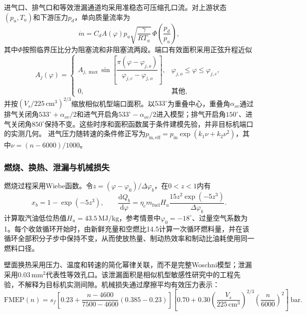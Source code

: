 \documentclass[withoutpreface,bwprint]{cumcmthesis}
\begin{document}
进气口、排气口和等效泄漏通道均采用准稳态可压缩孔口流\cite{blair1999engine}。对上游状态$(p_u,T_u)$和下游压力$p_d$，单向质量流率为
\begin{equation}
 \dot m=C_dA(\varphi)p_u\sqrt{\frac{\gamma}{RT_u}}\,
 \Phi\!\left(\frac{p_d}{p_u}\right),
 \label{eq:q2-orifice}
\end{equation}
其中$\Phi$按照临界压比分为阻塞流和非阻塞流两段。端口有效面积采用正弦升程近似
\begin{equation}
 A_j(\varphi)=
 \begin{cases}
 A_{j,\max}\sin\!\left[\dfrac{\pi(\varphi-\varphi_{j,o})}
 {\varphi_{j,c}-\varphi_{j,o}}\right],
 &\varphi_{j,o}\leq\varphi\leq\varphi_{j,c},\\
 0,&\text{其他},
 \end{cases}
 \label{eq:q2-port-area}
\end{equation}
并按$(V_s/225\,\mathrm{cm^3})^{2/3}$缩放相似机型端口面积。以$533^\circ$为重叠中心，重叠角$\alpha_{ov}$通过排气关闭角$533^\circ+\alpha_{ov}/2$和进气开启角$533^\circ-\alpha_{ov}/2$进入模型；排气开启角$150^\circ$、进气关闭角$850^\circ$保持不变。这些时序和面积函数属于条件建模先验，并非目标机端口的实测几何。
进气压力随转速的条件修正写为$p_{\mathrm{in,eff}}=p_{\mathrm{in}}\exp(k_1\nu+k_2\nu^2)$，其中$\nu=(n-6000)/1000$。

\subsubsection{燃烧、换热、泄漏与机械损失}

燃烧过程采用Wiebe函数\cite{ghojel2010wiebe}。令$z=(\varphi-\varphi_0)/\Delta\varphi_b$，在$0<z<1$内有
\begin{equation}
 x_b=1-\exp(-5z^3),\qquad
 \frac{\mathrm dQ_b}{\mathrm d\varphi}
 =\eta_c m_{\mathrm{fuel}}H_u\frac{15z^2\exp(-5z^3)}{\Delta\varphi_b}.
 \label{eq:q2-wiebe}
\end{equation}
计算取汽油低位热值$H_u=43.5\,\mathrm{MJ/kg}$，参考情景中$\varphi_0=-18^\circ$、过量空气系数为1。每个收敛循环开始时，由新鲜充量和空燃比14.5计算一次循环燃料量，并在该循环全部积分子步中保持不变，从而使放热量、制动热效率和制动比油耗使用同一燃料口径。

壁面换热采用压力、温度和转速的简化幂律关联，而不是完整Woschni模型\cite{woschni1967heat}；泄漏采用$0.03\,\mathrm{mm^2}$代表性等效孔口。该泄漏面积是相似机型敏感性研究中的工程先验，不解释为目标机实测间隙。机械损失通过摩擦平均有效压力表示\cite{heywood2018ice}：
\begin{equation}
 \mathrm{FMEP}(n)=s_f\left[0.23+
 \frac{n-4600}{7500-4600}(0.385-0.23)\right]
 \left[0.70+0.30\left(\frac{V_s}{225\,\mathrm{cm^3}}\right)^{2/3}
 \left(\frac{n}{6000}\right)^2\right]\ \mathrm{bar}.
 \label{eq:q2-fmep}
\end{equation}
\end{document}
